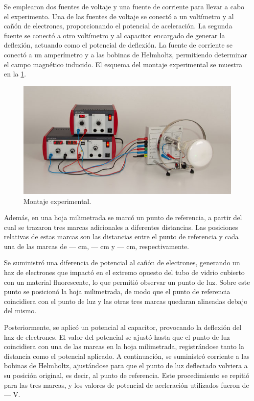 Se emplearon dos fuentes de voltaje y una fuente de corriente para llevar a cabo
el experimento.
Una de las fuentes de voltaje se conectó a un voltímetro y al cañón de
electrones, proporcionando el potencial de aceleración.
La segunda fuente se conectó a otro voltímetro y al capacitor encargado de
generar la deflexión, actuando como el potencial de deflexión.
La fuente de corriente se conectó a un amperímetro y a las bobinas de Helmholtz,
permitiendo determinar el campo magnético inducido.
El esquema del montaje experimental se muestra en la \cref{fig:set-up}.

\begin{figure}[htbp!]
  \centering
  \includegraphics[width=0.8\linewidth]{./images/braun-tube.jpg}
  \caption{Montaje experimental.}
  \label{fig:set-up}
\end{figure}

Además, en una hoja milimetrada se marcó un punto de referencia, a partir del
cual se trazaron tres marcas adicionales a diferentes distancias.
Las posiciones relativas de estas marcas son las distancias entre el punto de 
referencia y cada una de las marcas de --- cm, --- cm y --- cm, respectivamente.

Se suministró una diferencia de potencial al cañón de electrones, generando un
haz de electrones que impactó en el extremo opuesto del tubo de vidrio cubierto
con un material fluorescente, lo que permitió observar un punto de luz.
Sobre este punto se posicionó la hoja milimetrada, de modo que el punto de
referencia coincidiera con el punto de luz y las otras tres marcas quedaran
alineadas debajo del mismo.

Posteriormente, se aplicó un potencial al capacitor, provocando la deflexión del
haz de electrones.
El valor del potencial se ajustó hasta que el punto de luz coincidiera con una
de las marcas en la hoja milimetrada, registrándose tanto la distancia como el
potencial aplicado.
A continuación, se suministró corriente a las bobinas de Helmholtz, ajustándose
para que el punto de luz deflectado volviera a su posición original, es decir,
al punto de referencia.
Este procedimiento se repitió para las tres marcas, y los valores de potencial
de aceleración utilizados fueron de --- V.
